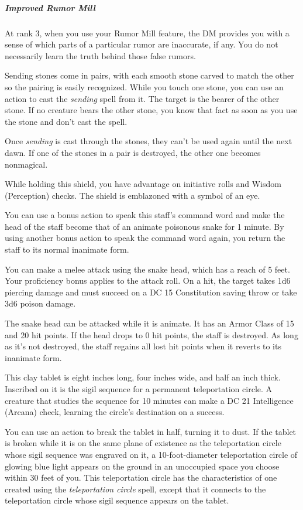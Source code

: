 \documentclass[10pt,a4paper,twoside,fancy,bg=print,twocolumn,openany,nodeprecatedcode]{dndbook}
\begin{document}
\subparagraph{Improved Rumor Mill}
At rank 3, when you use your Rumor Mill feature, the DM provides you with a sense of which parts of a particular rumor are inaccurate, if any. You do not necessarily learn the truth behind those false rumors.

Sending stones come in pairs, with each smooth stone carved to match the other so the pairing is easily recognized. While you touch one stone, you can use an action to cast the \textit{sending} spell from it. The target is the bearer of the other stone. If no creature bears the other stone, you know that fact as soon as you use the stone and don't cast the spell.

Once \textit{sending} is cast through the stones, they can't be used again until the next dawn. If one of the stones in a pair is destroyed, the other one becomes nonmagical.

While holding this shield, you have advantage on initiative rolls and Wisdom (Perception) checks. The shield is emblazoned with a symbol of an eye.

You can use a bonus action to speak this staff's command word and make the head of the staff become that of an animate poisonous snake for 1 minute. By using another bonus action to speak the command word again, you return the staff to its normal inanimate form.

You can make a melee attack using the snake head, which has a reach of 5 feet. Your proficiency bonus applies to the attack roll. On a hit, the target takes 1d6 piercing damage and must succeed on a DC 15 Constitution saving throw or take 3d6 poison damage.

The snake head can be attacked while it is animate. It has an Armor Class of 15 and 20 hit points. If the head drops to 0 hit points, the staff is destroyed. As long as it's not destroyed, the staff regains all lost hit points when it reverts to its inanimate form.

This clay tablet is eight inches long, four inches wide, and half an inch thick. Inscribed on it is the sigil sequence for a permanent teleportation circle. A creature that studies the sequence for 10 minutes can make a DC 21 Intelligence (Arcana) check, learning the circle's destination on a success.

You can use an action to break the tablet in half, turning it to dust. If the tablet is broken while it is on the same plane of existence as the teleportation circle whose sigil sequence was engraved on it, a 10-foot-diameter teleportation circle of glowing blue light appears on the ground in an unoccupied space you choose within 30 feet of you. This teleportation circle has the characteristics of one created using the \textit{teleportation circle} spell, except that it connects to the teleportation circle whose sigil sequence appears on the tablet.
\end{document}
